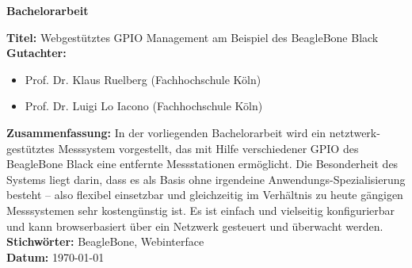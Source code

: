 \begin{center}
	\textbf{Bachelorarbeit}
\end{center}

\noindent \textbf{Titel:} Webgestütztes GPIO Management am Beispiel des BeagleBone Black\\

\noindent \textbf{Gutachter:}
\begin{itemize}
	\item Prof. Dr. Klaus Ruelberg (Fachhochschule Köln)
	\item Prof. Dr. Luigi Lo Iacono (Fachhochschule Köln)
\end{itemize}

\noindent \textbf{Zusammenfassung:} In der vorliegenden Bachelorarbeit wird ein netztwerk-gestütztes Messsystem vorgestellt, das mit Hilfe verschiedener GPIO des BeagleBone Black eine entfernte Messstationen ermöglicht. Die Besonderheit des Systems liegt darin, dass es als Basis ohne irgendeine Anwendungs-Spezialisierung besteht – also flexibel einsetzbar und gleichzeitig im Verhältnis zu heute gängigen Messsystemen sehr kostengünstig ist. Es ist einfach und vielseitig konfigurierbar und kann browserbasiert über ein Netzwerk gesteuert und überwacht werden.\\

\noindent \textbf{Stichwörter:} BeagleBone, Webinterface\\
\noindent \textbf{Datum:} {\longdate \today}